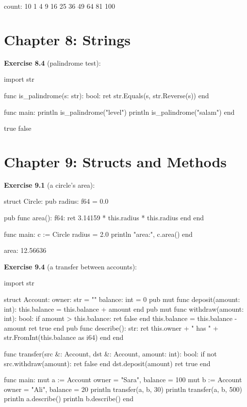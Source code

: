 \begin{progout}
count: 10
1 4 9 16 25 36 49 64 81 100
\end{progout}

\section*{Chapter 8: Strings}

\textbf{Exercise 8.4} (palindrome test):

\begin{salamen}
import str

func is_palindrome(s: str): bool:
    ret str.Equals(s, str.Reverse(s))
end

func main:
    println is_palindrome("level")
    println is_palindrome("salam")
end
\end{salamen}

\begin{progout}
true
false
\end{progout}

\section*{Chapter 9: Structs and Methods}

\textbf{Exercise 9.1} (a circle's area):

\begin{salamen}
struct Circle:
    pub radius: f64 = 0.0

    pub func area(): f64:
        ret 3.14159 * this.radius * this.radius
    end
end

func main:
    c := Circle { radius = 2.0 }
    println "area:", c.area()
end
\end{salamen}

\begin{progout}
area: 12.56636
\end{progout}

\textbf{Exercise 9.4} (a transfer between accounts):

\begin{salamen}
import str

struct Account:
    owner: str = ""
    balance: int = 0
    pub mut func deposit(amount: int):
        this.balance = this.balance + amount
    end
    pub mut func withdraw(amount: int): bool:
        if amount > this.balance:
            ret false
        end
        this.balance = this.balance - amount
        ret true
    end
    pub func describe(): str:
        ret this.owner + " has " + str.FromInt(this.balance as i64)
    end
end

func transfer(src &: Account, dst &: Account, amount: int): bool:
    if not src.withdraw(amount):
        ret false
    end
    dst.deposit(amount)
    ret true
end

func main:
    mut a := Account { owner = "Sara", balance = 100 }
    mut b := Account { owner = "Ali", balance = 20 }
    println transfer(a, b, 30)
    println transfer(a, b, 500)
    println a.describe()
    println b.describe()
end
\end{salamen}


